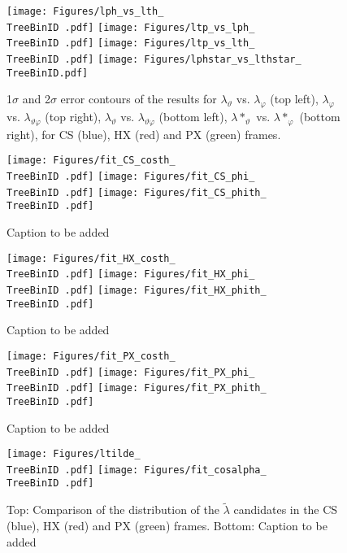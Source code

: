 \documentclass[12pt]{article}
\newcommand{\lamth}{\lambda_\vartheta}
\newcommand{\lamph}{\lambda_\varphi}
\newcommand{\lamthph}{\lambda_{\vartheta\varphi}}
\newcommand{\lamtilde}{\tilde{\lambda}}
\newcommand{\lamthstar}{\lambda*_\vartheta}
\newcommand{\lamphstar}{\lambda*_\varphi}
\providecommand{\TreeBinID}[1]{TreeBinIDDefault_rap1pt1cpm1}%
\begin{document}




\begin{figure}[htbp]
\centering
\texttt{[image: Figures/lph\_vs\_lth\_\\TreeBinID .pdf]}
\texttt{[image: Figures/ltp\_vs\_lph\_\\TreeBinID .pdf]}
\texttt{[image: Figures/ltp\_vs\_lth\_\\TreeBinID .pdf]}
\texttt{[image: Figures/lphstar\_vs\_lthstar\_\\TreeBinID.pdf]}
\caption{1$\sigma$ and 2$\sigma$ error contours of the results for $\lamth$
vs. $\lamph$ (top left), $\lamph$ vs. $\lamthph$ (top right), $\lamth$ vs.
$\lamthph$ (bottom left), $\lamthstar$ vs. $\lamphstar$ (bottom right), for CS
(blue), HX (red) and PX (green) frames.}
\end{figure}
\clearpage




\begin{figure}[htbp]
\centering
\texttt{[image: Figures/fit\_CS\_costh\_\\TreeBinID .pdf]}
\texttt{[image: Figures/fit\_CS\_phi\_\\TreeBinID .pdf]}
\texttt{[image: Figures/fit\_CS\_phith\_\\TreeBinID .pdf]}
\caption{Caption to be added}
\end{figure}
\clearpage

\begin{figure}[htbp]
\centering
\texttt{[image: Figures/fit\_HX\_costh\_\\TreeBinID .pdf]}
\texttt{[image: Figures/fit\_HX\_phi\_\\TreeBinID .pdf]}
\texttt{[image: Figures/fit\_HX\_phith\_\\TreeBinID .pdf]}
\caption{Caption to be added}
\end{figure}
\clearpage

\begin{figure}[htbp]
\centering
\texttt{[image: Figures/fit\_PX\_costh\_\\TreeBinID .pdf]}
\texttt{[image: Figures/fit\_PX\_phi\_\\TreeBinID .pdf]}
\texttt{[image: Figures/fit\_PX\_phith\_\\TreeBinID .pdf]}
\caption{Caption to be added}
\end{figure}
\clearpage

\begin{figure}[htbp]
\centering
\texttt{[image: Figures/ltilde\_\\TreeBinID .pdf]}
\texttt{[image: Figures/fit\_cosalpha\_\\TreeBinID .pdf]}
\caption{Top: Comparison of the distribution of the $\lamtilde$ candidates in
the CS (blue), HX (red) and PX (green) frames. Bottom: Caption to be added}
\end{figure}
\clearpage
\end{document}
